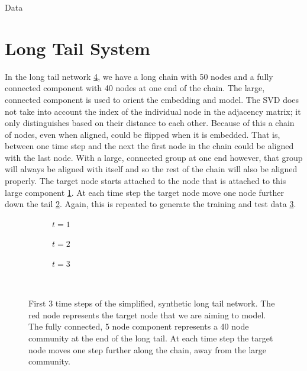 \documentclass[12pt]{amsbook}
\begin{document}
\begin{chapter}{Data}
    \section{Long Tail System}
        \label{longtaildata}
        In the long tail network \cref{longTail train series}, we have a long chain with 50 nodes and a fully connected component with 40 nodes at one end of the chain. The large, connected component is used to orient the embedding and model. The SVD does not take into account the index of the individual node in the adjacency matrix; it only distinguishes based on their distance to each other. Because of this a chain of nodes, even when aligned, could be flipped when it is embedded. That is, between one time step and the next the first node in the chain could be aligned with the last node. With a large, connected group at one end however, that group will always be aligned with itself and so the rest of the chain will also be aligned properly. The target node starts attached to the node that is attached to this large component \cref{longTail train series a}. At each time step the target node move one node further down the tail \cref{longTail train series b}. Again, this is repeated to generate the training and test data \cref{longTail train series c}.
        \begin{figure}[H]
            \centering
            \begin{subfigure}[c]{0.3\textwidth}
                \centering
                \resizebox{.6\width}{!}{}
                \caption{$t=1$}
                \label{longTail train series a}
            \end{subfigure}
            \hfill
            \centering
            \begin{subfigure}[c]{0.3\textwidth}
                \centering
                \resizebox{.6\width}{!}{}
                \caption{$t=2$}
                \label{longTail train series b}
            \end{subfigure}
            \hfill
            \centering
            \begin{subfigure}[c]{0.3\textwidth}
                \centering
                \resizebox{.6\width}{!}{}
                \caption{$t=3$}
                \label{longTail train series c}
            \end{subfigure}\\
            \caption{First 3 time steps of the simplified, synthetic long tail network. The red node represents the target node that we are aiming to model. The fully connected, 5 node component represents a 40 node community at the end of the long tail. At each time step the target node moves one step further along the chain, away from the large community.}
            \label{longTail train series}
        \end{figure}    


\end{chapter}
\end{document}
